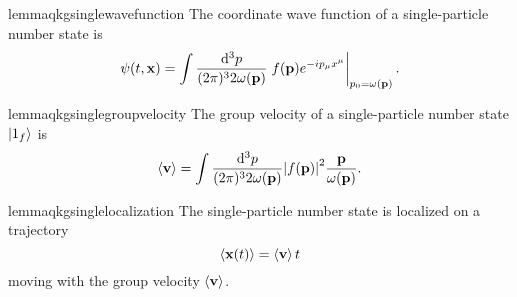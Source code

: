 \begin{restatable}{lemma}{qkgsinglewavefunction}\label{thm:qkg_number_state_single_wave_function}
	The coordinate wave function of a single-particle number state is
	\begin{equation}
		\psi(t,\vb{x})
		=
		\int\frac{\dd[3]{p}}{(2\pi)^32\omega(\vb{p})}
		\eval{
			f(\vb{p})
			e^{-ip_\mu x^\mu}
		}_{p_0=\omega(\vb{p})}
		.
	\end{equation}
\end{restatable}
\begin{restatable}{lemma}{qkgsinglegroupvelocity}\label{thm:number_state_single_group_velocity}
	The group velocity of a single-particle number state $\ket{1_f}$ is
	\begin{equation}
		\expval{\vb{v}}
		=
		\int\frac{\dd[3]{p}}{(2\pi)^32\omega(\vb{p})}
		\abs{f(\vb{p})}^2
		\frac{\vb{p}}{\omega(\vb{p})}
		\label{eq:single_particle_number_state_group_velocity}
		.
	\end{equation}
\end{restatable}
\begin{restatable}{lemma}{qkgsinglelocalization}
	The single-particle number state is localized on a trajectory
	\begin{equation}
		\expval{\vb{x}(t)}
		=
		\expval{\vb{v}}t
	\end{equation}
	moving with the group velocity $\expval{\vb{v}}$.
\end{restatable}